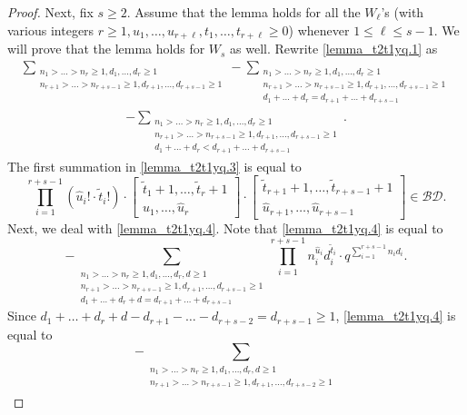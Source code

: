 \documentclass[10pt,a4paper]{amsart}
\newcommand{\BD}{\mathcal {BD}}
\newcommand{\w}{\tilde}
\begin{document}
\begin{proof}
Next, fix $s \ge 2$. Assume that the lemma holds for all the $W_\ell$'s 
(with various integers $r \ge 1, u_1, \ldots, u_{r+\ell}, 
t_1, \ldots, t_{r+\ell} \ge 0$) whenever $1 \le \ell \le s-1$. 
We will prove that the lemma holds for $W_s$ as well.
Rewrite \eqref{lemma_t2t1yq.1} as
\begin{eqnarray}  \label{lemma_t2t1yq.3}
\sum_{\substack{n_1 > \ldots > n_r \ge 1, d_1, \ldots, d_r \ge 1\\
    n_{r+1} > \ldots > n_{r+s-1} \ge 1, d_{r+1}, \ldots, d_{r+s-1} \ge 1}}
- \sum_{\substack{n_1 > \ldots > n_r \ge 1, d_1, \ldots, d_r \ge 1\\
    n_{r+1} > \ldots > n_{r+s-1} \ge 1, d_{r+1}, \ldots, d_{r+s-1} \ge 1\\
    d_1+ \ldots + d_r = d_{r+1} + \ldots + d_{r+s-1}}}
\end{eqnarray}
\begin{eqnarray}  \label{lemma_t2t1yq.4}
- \sum_{\substack{n_1 > \ldots > n_r \ge 1, d_1, \ldots, d_r \ge 1\\
    n_{r+1} > \ldots > n_{r+s-1} \ge 1, d_{r+1}, \ldots, d_{r+s-1} \ge 1\\
    d_1+ \ldots + d_r < d_{r+1} + \ldots + d_{r+s-1}}}.
\end{eqnarray}
The first summation in \eqref{lemma_t2t1yq.3} is equal to
$$
\prod_{i=1}^{r+s-1} (\hat u_i! \cdot \w t_i!) \cdot 
   \begin{bmatrix} \w t_1 + 1, \ldots, \w t_r + 1\\
     \hat u_1, \ldots, \hat u_r 
   \end{bmatrix}
\cdot \begin{bmatrix} \w t_{r+1} + 1, \ldots, \w t_{r+s-1} + 1\\
     \hat u_{r+1}, \ldots, \hat u_{r+s-1}
   \end{bmatrix}
\in \BD.
$$
Next, we deal with \eqref{lemma_t2t1yq.4}. 
Note that \eqref{lemma_t2t1yq.4} is equal to
$$
- \sum_{\substack{n_1 > \ldots > n_r \ge 1, d_1, \ldots, d_r, d \ge 1\\
    n_{r+1} > \ldots > n_{r+s-1} \ge 1, d_{r+1}, \ldots, d_{r+s-1} \ge 1\\
    d_1+ \ldots + d_r + d = d_{r+1} + \ldots + d_{r+s-1}}}
    \prod_{i=1}^{r+s-1} n_i^{\hat u_i}d_i^{\w t_i}  
    \cdot q^{\sum_{i=1}^{r+s-1} n_i d_i}.
$$
Since $d_1+ \ldots + d_r + d - d_{r+1} - \ldots - d_{r+s-2} 
= d_{r+s-1} \ge 1$, \eqref{lemma_t2t1yq.4} is equal to
$$
- \sum_{\substack{n_1 > \ldots > n_r \ge 1, d_1, \ldots, d_r, d \ge 1\\
    n_{r+1} > \ldots > n_{r+s-1} \ge 1, d_{r+1}, \ldots, d_{r+s-2} \ge 1\\
}}$$
\end{proof}
\end{document}

